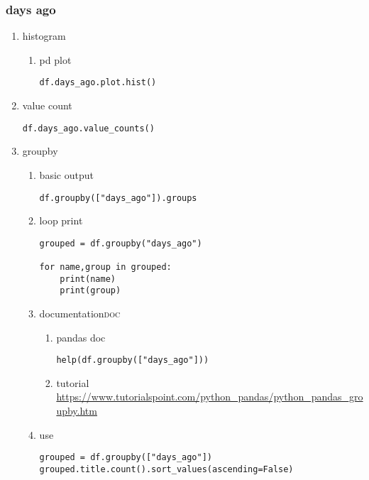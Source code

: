 \documentclass[11pt]{article}
\begin{document}
\subsubsection{days ago}
\label{sec:org6df52dd}
\begin{enumerate}
\item histogram
\label{sec:org627f21e}
\begin{enumerate}
\item pd plot
\label{sec:orgf772232}
\begin{verbatim}
df.days_ago.plot.hist()
\end{verbatim}
\end{enumerate}
\item value count
\label{sec:orgf9b361b}
\begin{verbatim}
df.days_ago.value_counts()
\end{verbatim}
\item groupby
\label{sec:org8ce1252}
\begin{enumerate}
\item basic output
\label{sec:org03aaabb}
\begin{verbatim}
df.groupby(["days_ago"]).groups
\end{verbatim}
\item loop print
\label{sec:org9ae8962}
\begin{verbatim}
grouped = df.groupby("days_ago")

for name,group in grouped:
    print(name)
    print(group)
\end{verbatim}
\item documentation\hfill{}\textsc{doc}
\label{sec:org416afbb}
\begin{enumerate}
\item pandas doc
\label{sec:org9c3445c}
\begin{verbatim}
help(df.groupby(["days_ago"]))
\end{verbatim}
\item tutorial
\label{sec:orgd9a4f16}
\url{https://www.tutorialspoint.com/python\_pandas/python\_pandas\_groupby.htm}
\end{enumerate}
\item use
\label{sec:org6cc200b}
\begin{verbatim}
grouped = df.groupby(["days_ago"])
grouped.title.count().sort_values(ascending=False)
\end{verbatim}
\end{enumerate}
\end{enumerate}
\end{document}
